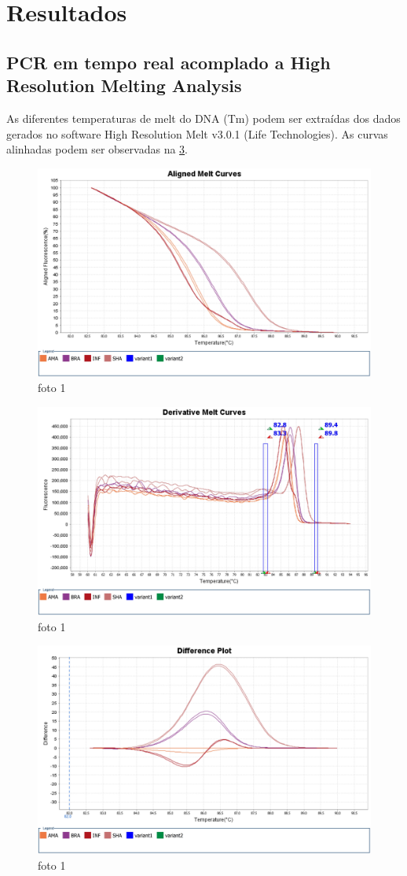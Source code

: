 \section{Resultados}
\subsection{PCR em tempo real acomplado a High Resolution Melting Analysis}
As diferentes temperaturas de melt do DNA (Tm) podem ser extraídas dos dados
gerados no software High Resolution Melt v3.0.1 (Life Technologies). As curvas
alinhadas podem ser observadas na \cref{almeltc}.
\begin{figure}
        \centering
        \includegraphics[width=.5\linewidth]{fig/Aligned Melt Curves.jpg}
        \caption{foto 1}
        \label{almeltc}
\end{figure}
    
\begin{figure}
        \centering
        \includegraphics[width=.5\linewidth]{fig/Derivative Melt Curves.jpg}
        \caption{foto 1}
        \label{almeltc}
\end{figure}

\begin{figure}
        \centering
        \includegraphics[width=.5\linewidth]{fig/Difference Plot.jpg}
        \caption{foto 1}
        \label{almeltc}
\end{figure}

